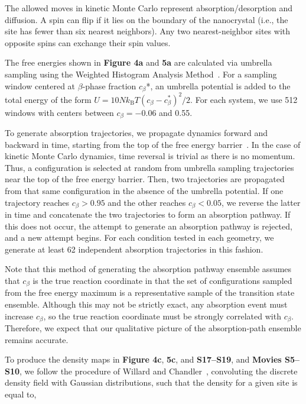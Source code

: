 \documentclass[reprint,amsmath,amssymb,aip,nofootinbib, citeautoscript,]{revtex4-2}
\begin{document}
The allowed moves in kinetic Monte Carlo represent absorption/desorption and diffusion. A spin can flip if it lies on the boundary of the nanocrystal (i.e., the site has fewer than six nearest neighbors). Any two nearest-neighbor sites with opposite spins can exchange their spin values.


The free energies shown in \textbf{Figure 4a} and \textbf{5a} are calculated via umbrella sampling using the Weighted Histogram Analysis Method~\cite{grossfield_wham}. For a sampling window centered at $\beta$-phase fraction $c_\beta$*, an umbrella potential is added to the total energy of the form $U=10Nk_\mathrm{B}T(c_\beta-c_\beta^*)^2/2$. For each system, we use 512 windows with centers between $c_\beta = -0.06$ and 0.55.


To generate absorption trajectories, we propagate dynamics forward and backward in time, starting from the top of the free energy barrier~\cite{bolhuis_transition_2002}. In the case of kinetic Monte Carlo dynamics, time reversal is trivial as there is no momentum. Thus, a configuration is selected at random from umbrella sampling trajectories near the top of the free energy barrier. Then, two trajectories are propagated from that same configuration in the absence of the umbrella potential. If one trajectory reaches $c_\beta > 0.95$ and the other reaches $c_\beta < 0.05$, we reverse the latter in time and concatenate the two trajectories to form an absorption pathway. If this does not occur, the attempt to generate an absorption pathway is rejected, and a new attempt begins. For each condition tested in each geometry, we generate at least 62 independent absorption trajectories in this fashion.


Note that this method of generating the absorption pathway ensemble assumes that $c_\beta$ is the true reaction coordinate in that the set of configurations sampled from the free energy maximum is a representative sample of the transition state ensemble. Although this may not be strictly exact, any absorption event must increase $c_\beta$, so the true reaction coordinate must be strongly correlated with $c_\beta$. Therefore, we expect that our qualitative picture of the absorption-path ensemble remains accurate.


To produce the density maps in \textbf{Figure 4c}, \textbf{5c}, and \textbf{S17–S19}, and \textbf{Movies S5–S10}, we follow the procedure of Willard and Chandler~\cite{willard_instantaneous_2010}, convoluting the discrete density field with Gaussian distributions, such that the density for a given site is equal to,
\end{document}
